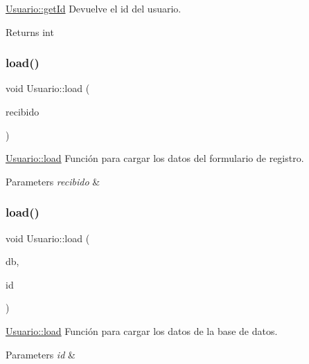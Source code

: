 \mbox{\hyperlink{classUsuario_af72cadb2cfa815ef3318f2544d1df4ef}{Usuario\+::get\+Id}} Devuelve el id del usuario. 

\begin{DoxyReturn}{Returns}
int 
\end{DoxyReturn}
\mbox{\label{classUsuario_a99d91848f5937e76640798e9dadabc5f}} 
\subsubsection{\texorpdfstring{load()}{load()}\hspace{0.1cm}{\footnotesize\ttfamily [1/2]}}
{\footnotesize\ttfamily void Usuario\+::load (\begin{DoxyParamCaption}\item[{J\+S\+ON}]{recibido }\end{DoxyParamCaption})}



\mbox{\hyperlink{classUsuario_a99d91848f5937e76640798e9dadabc5f}{Usuario\+::load}} Función para cargar los datos del formulario de registro. 


\begin{DoxyParams}{Parameters}
{\em recibido} & \\
\hline
\end{DoxyParams}
\mbox{\label{classUsuario_abc771f3aad5fac378fff2b2fda9e77f7}} 
\subsubsection{\texorpdfstring{load()}{load()}\hspace{0.1cm}{\footnotesize\ttfamily [2/2]}}
{\footnotesize\ttfamily void Usuario\+::load (\begin{DoxyParamCaption}\item[{Q\+Sql\+Database}]{db,  }\item[{int}]{id }\end{DoxyParamCaption})}



\mbox{\hyperlink{classUsuario_a99d91848f5937e76640798e9dadabc5f}{Usuario\+::load}} Función para cargar los datos de la base de datos. 


\begin{DoxyParams}{Parameters}
{\em id} & \\
\hline
\end{DoxyParams}
\mbox{\label{classUsuario_a95a63c1e8c167f7084198257dbb0ad60}} 
